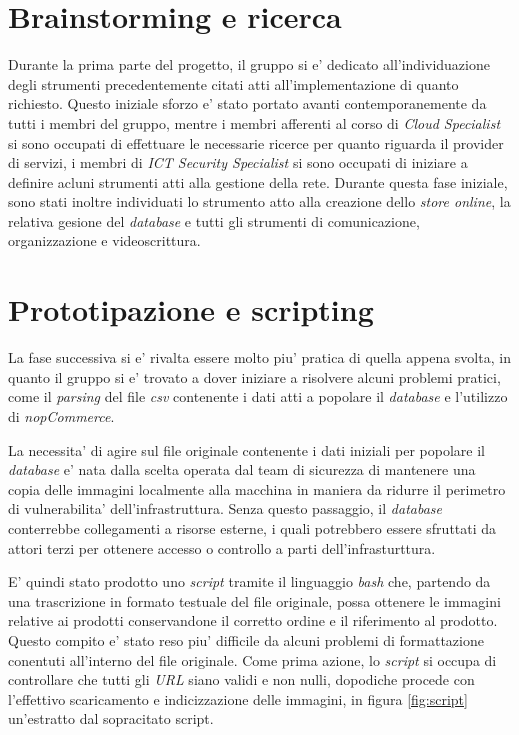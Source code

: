 \documentclass[a4paper]{report}
\begin{document}
	\section{Brainstorming e ricerca}\label{brainstorming_e_ricerca}
		Durante la prima parte del progetto, il gruppo si e' dedicato all'individuazione degli strumenti precedentemente
		citati atti all'implementazione di quanto richiesto. Questo iniziale sforzo e' stato portato avanti
		contemporanemente da tutti i membri del gruppo, mentre i membri afferenti al corso di \emph{Cloud Specialist} si
		sono occupati di effettuare le necessarie ricerce per quanto riguarda il provider di servizi, i membri di
		\emph{ICT Security Specialist} si sono occupati di iniziare a definire acluni strumenti atti alla gestione della
		rete.
		Durante questa fase iniziale, sono stati inoltre individuati lo strumento atto alla creazione dello \emph{store
		online}, la relativa gesione del \emph{database} e tutti gli strumenti di comunicazione, organizzazione e
		videoscrittura.
	\section{Prototipazione e scripting}\label{prototipazione_e_scripting}
		La fase successiva si e' rivalta essere molto piu' pratica di quella appena svolta, in quanto il gruppo si e'
		trovato a dover iniziare a risolvere alcuni problemi pratici, come il \emph{parsing} del file \emph{csv}
		contenente i dati atti a popolare il \emph{database} e l'utilizzo di \emph{nopCommerce}.

		La necessita' di agire sul file originale contenente i dati iniziali per popolare il \emph{database} e' nata
		dalla scelta operata dal team di sicurezza di mantenere una copia delle immagini localmente alla macchina in
		maniera da ridurre il perimetro di vulnerabilita' dell'infrastruttura. Senza questo passaggio, il
		\emph{database} conterrebbe collegamenti a risorse esterne, i quali potrebbero essere sfruttati da attori
		terzi per ottenere accesso o controllo a parti dell'infrasturttura.

		E' quindi stato prodotto uno \emph{script} tramite  il linguaggio \emph{bash} che, partendo da una trascrizione
		in formato testuale del file originale, possa ottenere le immagini relative ai prodotti conservandone il
		corretto ordine e il riferimento al prodotto. Questo compito e' stato reso piu' difficile da alcuni problemi di
		formattazione conentuti all'interno del file originale. Come prima azione, lo \emph{script} si occupa di
		controllare che tutti gli \emph{URL} siano validi e non nulli, dopodiche procede con l'effettivo scaricamento e
		indicizzazione delle immagini, in figura \ref{fig:script} un'estratto dal sopracitato script.
\end{document}
